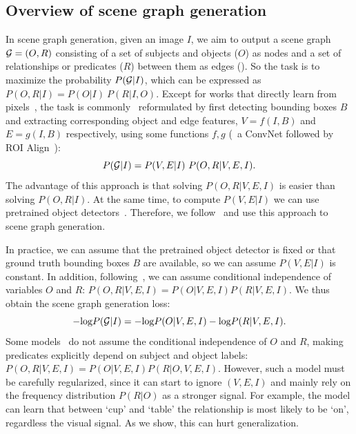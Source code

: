 \subsection{Overview of scene graph generation}
\label{sec:baseline}
In scene graph generation, given an image $I$, we aim to output a scene graph ${\cal G}=(O,R)$ consisting of a set of subjects and objects ($O$) as nodes and a set of relationships or predicates ($R$) between them as edges (\fig{\ref{fig:overview}}). So the task is to maximize the probability $P({\cal G} | I)$, which can be expressed as  $P(O,R | I) = P(O |I)\ P(R | I,O)$.
Except for works that directly learn from pixels~\citep{newell2017pixels}, the task is commonly~\citep{xu2017scene,yang2018graph,zellers2018neural} reformulated by first detecting bounding boxes $B$ and extracting corresponding object and edge features, $V=f(I,B)$ and $E=g(I,B)$ respectively, using some functions $f,g$ (\eg~a ConvNet followed by ROI Align~\citep{he2017mask}):
\begin{equation}
\label{eq:scene_graph_prob_box}
P({\cal G} |I) = P(V,E |I)\ P(O,R | V,E,I).%
\end{equation}
The advantage of this approach is that solving $P(O,R | V,E,I)$ is easier than solving $P(O,R | I)$. At the same time, to compute $P(V,E |I)$ we can use pretrained object detectors~\citep{ren2015faster, he2017mask}.
Therefore, we follow~\citep{xu2017scene,yang2018graph,zellers2018neural} and use this approach to scene graph generation.

In practice, we can assume that the pretrained object detector is fixed or that ground truth bounding boxes $B$ are available, so we can assume $P(V,E|I)$ is constant. In addition, following~\citep{lu2016visual,xu2017scene,yang2018graph}, we can assume conditional independence of variables $O$ and $R$: $P(O,R|V,E,I)=P(O|V,E,I)P(R|V,E,I)$. We thus obtain the scene graph generation loss:
\begin{equation}
\label{eq:scene_graph_prob_simple}
-\text{log} P({\cal G} |I) = -\text{log} P(O | V,E,I) - \text{log} P(R | V,E,I).
\end{equation}
Some models~\citep{zellers2018neural,zhang2019graphical} do not assume the conditional independence of $O$ and $R$, making predicates explicitly depend on subject and object labels: $P(O,R|V,E,I)=P(O|V,E,I) P(R|O,V,E,I)$. However, such a model must be carefully regularized, since it can start to ignore $(V,E,I)$ and mainly rely on the frequency distribution $P(R|O)$ as a stronger signal. For example, the model can learn that between `cup' and `table' the relationship is most likely to be `on', regardless the visual signal. As we show, this can hurt generalization.

